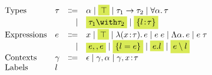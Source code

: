 \[
\begin{array}{l}
  \begin{array}{llrl}
    \text{Types} 
    & \tau & \Coloneqq & \alpha \mid \highlight{\top} \mid \tau_1 \to \tau_2 \mid \for \alpha \tau \\
    &      & \mid      & \highlight{\tau_1 \andop \tau_2} \mid \highlight{\recty l \tau} \\
    \text{Expressions} 
    & e & \Coloneqq & x \mid \highlight{\top} \mid \lam x \tau e \mid \app e e \mid \blam \alpha e \mid \tapp e \tau \\
    &   & \mid      & \highlight {e \mergeop e} \mid \highlight {\reccon l e} \mid
                      \highlight {e.l} \mid \highlight{e \restrictop l} \\
    \text{Contexts} 
    & \gamma & \Coloneqq & \epsilon \mid \gamma, \alpha \mid \gamma, x \hast \tau \\
    \text{Labels} & l
  \end{array} 
\end{array}
\]
